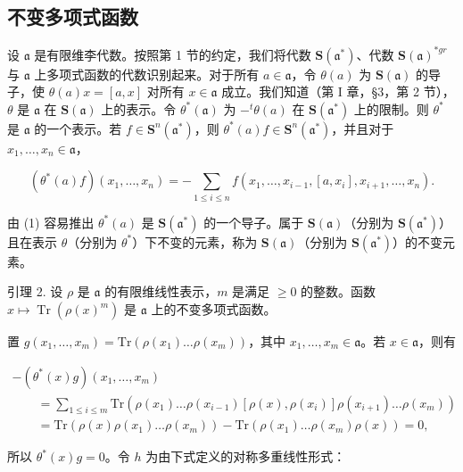 \subsection{不变多项式函数}

设 \(\mathfrak{a}\) 是有限维李代数。按照第 1 节的约定，我们将代数 \(\mathbf{S}(\mathfrak{a}^{*})\)、代数 \(\mathbf{S}(\mathfrak{a})^{*gr}\) 与 \(\mathfrak{a}\) 上多项式函数的代数识别起来。对于所有 \(a \in \mathfrak{a}\)，令 \(\theta(a)\) 为 \(\mathbf{S}(\mathfrak{a})\) 的导子，使 \(\theta(a)x = [a, x]\) 对所有 \(x \in \mathfrak{a}\) 成立。我们知道（第 I 章，§3，第 2 节），\(\theta\) 是 \(\mathfrak{a}\) 在 \(\mathbf{S}(\mathfrak{a})\) 上的表示。令 \(\theta^{*}(\mathfrak{a})\) 为 \(-^{t}\theta(a)\) 在 \(\mathbf{S}(\mathfrak{a}^{*})\) 上的限制。则 \(\theta^{*}\) 是 \(\mathfrak{a}\) 的一个表示。若 \(f \in \mathbf{S}^{n}(\mathfrak{a}^{*})\)，则 \(\theta^{*}(a)f \in \mathbf{S}^{n}(\mathfrak{a}^{*})\)，并且对于 \(x_{1}, \ldots, x_{n} \in \mathfrak{a}\)，

\[
(\theta^ {*} (a) f) (x _ {1}, \dots , x _ {n}) = - \sum_ {1 \leq i \leq n} f (x _ {1}, \dots , x _ {i - 1}, [ a, x _ {i} ], x _ {i + 1}, \dots , x _ {n}).\tag{1}
\]

由 (1) 容易推出 \(\theta^{*}(a)\) 是 \(\mathbf{S}(\mathfrak{a}^{*})\) 的一个导子。属于 \(\mathbf{S}(\mathfrak{a})\)（分别为 \(\mathbf{S}(\mathfrak{a}^{*})\)）且在表示 \(\theta\)（分别为 \(\theta^{*}\)）下不变的元素，称为 \(\mathbf{S}(\mathfrak{a})\)（分别为 \(\mathbf{S}(\mathfrak{a}^{*})\)）的不变元素。

引理 2. 设 \(\rho\) 是 \(\mathfrak{a}\) 的有限维线性表示，\(m\) 是满足 \(\geq 0\) 的整数。函数 \(x \mapsto \operatorname{Tr}(\rho(x)^m)\) 是 \(\mathfrak{a}\) 上的不变多项式函数。

置 \(g(x_{1},\ldots ,x_{m}) = \mathrm{Tr}(\rho (x_{1})\ldots \rho (x_{m}))\)，其中 \(x_{1},\ldots ,x_{m}\in \mathfrak{a}\)。若 \(x\in \mathfrak{a}\)，则有

\[
\begin{array}{l} - (\theta^ {*} (x) g) (x _ {1}, \ldots , x _ {m}) \\ \qquad = \sum_ {1 \leq i \leq m} \mathrm{Tr} (\rho (x _ {1}) \ldots \rho (x _ {i - 1}) [ \rho (x), \rho (x _ {i}) ] \rho (x _ {i + 1}) \ldots \rho (x _ {m})) \\ \qquad = \mathrm{Tr} (\rho (x) \rho (x _ {1}) \ldots \rho (x _ {m})) - \mathrm{Tr} (\rho (x _ {1}) \ldots \rho (x _ {m}) \rho (x)) = 0, \end{array}
\]

所以 \(\theta^{*}(x)g = 0\)。令 \(h\) 为由下式定义的对称多重线性形式：

